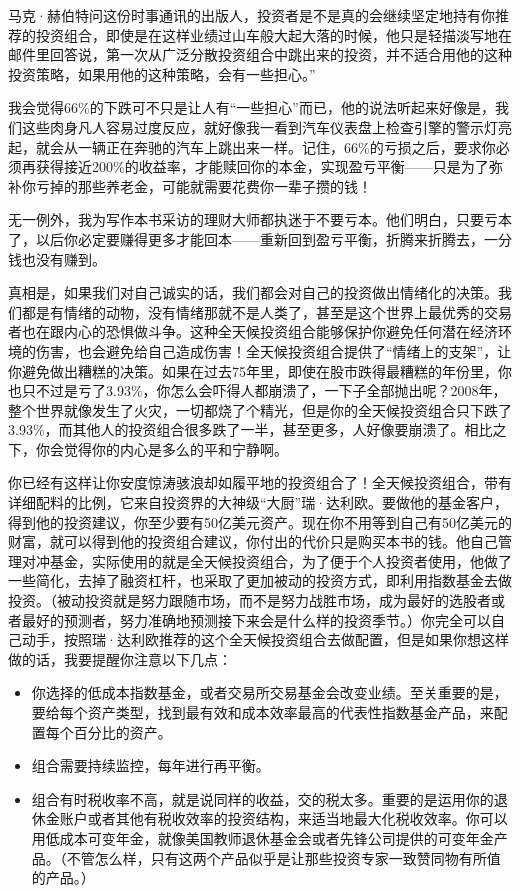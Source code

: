 马克·赫伯特问这份时事通讯的出版人，投资者是不是真的会继续坚定地持有你推荐的投资组合，即使是在这样业绩过山车般大起大落的时候，他只是轻描淡写地在邮件里回答说，第一次从广泛分散投资组合中跳出来的投资，并不适合用他的这种投资策略，如果用他的这种策略，会有一些担心。”

我会觉得66\%的下跌可不只是让人有“一些担心”而已，他的说法听起来好像是，我们这些肉身凡人容易过度反应，就好像我一看到汽车仪表盘上检查引擎的警示灯亮起，就会从一辆正在奔驰的汽车上跳出来一样。记住，66\%的亏损之后，要求你必须再获得接近200\%的收益率，才能赎回你的本金，实现盈亏平衡——只是为了弥补你亏掉的那些养老金，可能就需要花费你一辈子攒的钱！



无一例外，我为写作本书采访的理财大师都执迷于不要亏本。他们明白，只要亏本了，以后你必定要赚得更多才能回本——重新回到盈亏平衡，折腾来折腾去，一分钱也没有赚到。

真相是，如果我们对自己诚实的话，我们都会对自己的投资做出情绪化的决策。我们都是有情绪的动物，没有情绪那就不是人类了，甚至是这个世界上最优秀的交易者也在跟内心的恐惧做斗争。这种全天候投资组合能够保护你避免任何潜在经济环境的伤害，也会避免给自己造成伤害！全天候投资组合提供了“情绪上的支架”，让你避免做出糟糕的决策。如果在过去75年里，即使在股市跌得最糟糕的年份里，你也只不过是亏了3.93\%，你怎么会吓得人都崩溃了，一下子全部抛出呢？2008年，整个世界就像发生了火灾，一切都烧了个精光，但是你的全天候投资组合只下跌了3.93\%，而其他人的投资组合很多跌了一半，甚至更多，人好像要崩溃了。相比之下，你会觉得你的内心是多么的平和宁静啊。

你已经有这样让你安度惊涛骇浪却如履平地的投资组合了！全天候投资组合，带有详细配料的比例，它来自投资界的大神级“大厨”瑞·达利欧。要做他的基金客户，得到他的投资建议，你至少要有50亿美元资产。现在你不用等到自己有50亿美元的财富，就可以得到他的投资组合建议，你付出的代价只是购买本书的钱。他自己管理对冲基金，实际使用的就是全天候投资组合，为了便于个人投资者使用，他做了一些简化，去掉了融资杠杆，也采取了更加被动的投资方式，即利用指数基金去做投资。（被动投资就是努力跟随市场，而不是努力战胜市场，成为最好的选股者或者最好的预测者，努力准确地预测接下来会是什么样的投资季节。）你完全可以自己动手，按照瑞·达利欧推荐的这个全天候投资组合去做配置，但是如果你想这样做的话，我要提醒你注意以下几点：

\begin{itemize}
\item 你选择的低成本指数基金，或者交易所交易基金会改变业绩。至关重要的是，要给每个资产类型，找到最有效和成本效率最高的代表性指数基金产品，来配置每个百分比的资产。
\item 组合需要持续监控，每年进行再平衡。
\item 组合有时税收率不高，就是说同样的收益，交的税太多。重要的是运用你的退休金账户或者其他有税收效率的投资结构，来适当地最大化税收效率。你可以用低成本可变年金，就像美国教师退休基金会或者先锋公司提供的可变年金产品。（不管怎么样，只有这两个产品似乎是让那些投资专家一致赞同物有所值的产品。）
\end{itemize}

